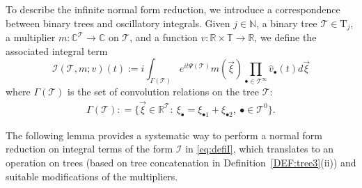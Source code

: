 \documentclass[%
11pt,  reqno]{amsart}
\newcommand{\5}{\textup{V}}
\newcommand{\ft}{\widehat}
\theoremstyle{remark}
\newcommand{\R}{\mathbb{R}}
\newcommand{\bbC}{\mathbb{C}}
\newcommand{\T}{\mathbb{T}}
\newcommand{\bul}{\bullet}
\newcommand{\TT}{\mathcal{T}}
\newcommand{\Tr}{\mathrm{T}}
\newcommand{\G}{\Gamma}
\newcommand{\N}{\mathbb{N}}
\newcommand{\B}{\mathcal{B}}
\newcommand{\Ical}{\mathcal{I}}
\numberwithin{equation}{section}
\numberwithin{theorem}{section}
\begin{document}
To describe the infinite normal form reduction, we introduce a correspondence between binary trees and oscillatory integrals. 
Given $j\in\N$, a binary tree $\TT \in \Tr_j$, a multiplier $m:\bbC^{\TT}\to \bbC$ on $\TT$, and a
function $v: \R\times \T \to\R$, we define the associated integral term
\begin{equation}\label{eq:defiI}
\Ical(\TT, m; v)(t) := i  \int_{\G(\TT)}
e^{it\Psi(\TT)}m(\vec{\xi})
\prod_{\bul\in \TT^\infty}  \ft v_\bul (t) d\vec{\xi}
\end{equation}
where $\G(\TT)$ is the set of convolution relations on the tree $\TT$:
\begin{align}
\label{Gamma}
\G(\TT) : = \big\{ \vec\xi \in \R^\TT: \ \xi_\bul = \xi_{\bul1} + \xi_{\bul2}, \ \bul \in \TT^0 \big\}. 
\end{align}



The following lemma provides a systematic way to perform a normal form reduction on integral terms of the form $\Ical$ in \eqref{eq:defiI}, which translates to an operation on trees (based on tree concatenation in Definition~\ref{DEF:tree3}(ii)) and suitable modifications of the multipliers. 
\end{document}
